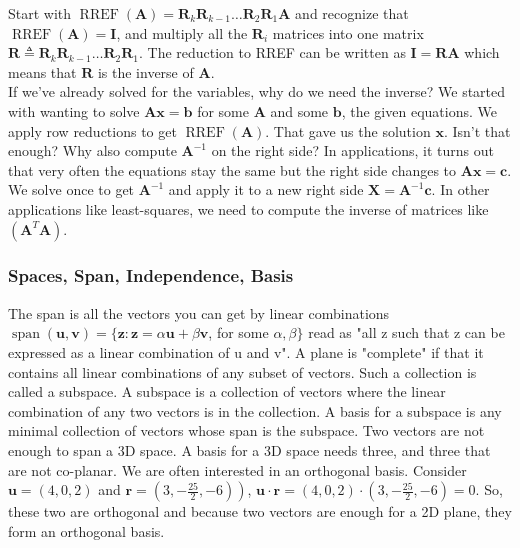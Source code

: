 \documentclass[main.tex]{subfiles}
\begin{document}
    Start with $\operatorname{RREF}(\mathbf{A})=\mathbf{R}_{k} \mathbf{R}_{k-1} \ldots \mathbf{R}_{2} \mathbf{R}_{1} \mathbf{A}$ and recognize that $\operatorname{RREF}(\mathbf{A})=\mathbf{I}$, and multiply all the $\mathbf{R}_{i}$ matrices into one matrix $\mathbf{R} \triangleq \mathbf{R}_{k} \mathbf{R}_{k-1} \ldots \mathbf{R}_{2} \mathbf{R}_{1}$. The reduction to RREF can be written as $\mathbf{I}=\mathbf{R} \mathbf{A}$ which means that $\mathbf{R}$ is the inverse of $\mathbf{A}$.\\
    
    If we've already solved for the variables, why do we need the inverse? We started with wanting to solve $\mathbf{A x}=\mathbf{b}$ for some $\mathbf{A}$ and some $\mathbf{b}$, the given equations. We apply row reductions to get $\operatorname{RREF}(\mathbf{A})$. That gave us the solution $\mathbf{x}$. Isn't that enough? Why also compute $\mathbf{A}^{-1}$ on the right side? In applications, it turns out that very often the equations stay the same but the right side changes to $\mathbf{A} \mathbf{x}=\mathbf{c}$. We solve once to get $\mathbf{A}^{-1}$ and apply it to a new right side $\mathbf{X}=\mathbf{A}^{-1} \mathbf{c}$. In other applications like least-squares, we need to compute the inverse of matrices like $\left(\mathbf{A}^{T} \mathbf{A}\right)$.
    
    \subsubsection{Spaces, Span, Independence, Basis}
    
    The span is all the vectors you can get by linear combinations $\operatorname{span}(\mathbf{u}, \mathbf{v})=\{\mathbf{z}: \mathbf{z}=\alpha \mathbf{u}+\beta \mathbf{v}$, for some $\alpha, \beta\}$ read as "all z such that z can be expressed as a linear combination of u and v". A plane is "complete" if that it contains all linear combinations of any subset of vectors. Such a collection is called a subspace. A subspace is a collection of vectors where the linear combination of any two vectors is in the collection. A basis for a subspace is any minimal collection of vectors whose span is the subspace. Two vectors are not enough to span a 3D space. A basis for a 3D space needs three, and three that are not co-planar. We are often interested in an orthogonal basis. Consider $\mathbf{u}=(4,0,2)$ and $\left.\mathbf{r}=\left(3,-\frac{25}{2},-6\right)\right)$, $\mathbf{u} \cdot \mathbf{r}=(4,0,2) \cdot\left(3,-\frac{25}{2},-6\right)=0$. So, these two are orthogonal and because two vectors are enough for a 2D plane, they form an orthogonal basis.\\
    
\end{document}
